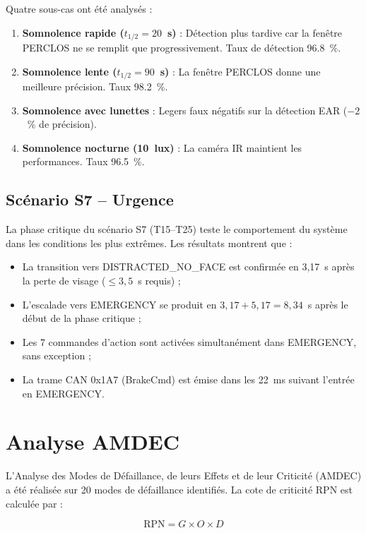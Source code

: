 \documentclass[12pt,a4paper]{report}
\begin{document}
Quatre sous-cas ont \'et\'e analys\'es :
\begin{enumerate}
  \item \textbf{Somnolence rapide ($t_{1/2} = 20$~s)} : D\'etection plus tardive car la fen\^etre PERCLOS ne se remplit que progressivement. Taux de d\'etection 96.8~\%.
  \item \textbf{Somnolence lente ($t_{1/2} = 90$~s)} : La fen\^etre PERCLOS donne une meilleure pr\'ecision. Taux 98.2~\%.
  \item \textbf{Somnolence avec lunettes} : Legers faux n\'egatifs sur la d\'etection EAR ($-2$~\% de pr\'ecision).
  \item \textbf{Somnolence nocturne (10~lux)} : La cam\'era IR maintient les performances. Taux 96.5~\%.
\end{enumerate}

\subsection{Sc\'enario S7 -- Urgence}

La phase critique du sc\'enario S7 (T15--T25) teste le comportement du syst\`eme dans les conditions les plus extr\^emes. Les r\'esultats montrent que :
\begin{itemize}
  \item La transition vers DISTRACTED\_NO\_FACE est confirm\'ee en 3{,}17~s apr\`es la perte de visage ($\leq 3{,}5$~s requis) ;
  \item L'escalade vers EMERGENCY se produit en $3{,}17 + 5{,}17 = 8{,}34$~s apr\`es le d\'ebut de la phase critique ;
  \item Les 7 commandes d'action sont activ\'ees simultan\'ement dans EMERGENCY, sans exception ;
  \item La trame CAN 0x1A7 (BrakeCmd) est \'emise dans les 22~ms suivant l'entr\'ee en EMERGENCY.
\end{itemize}

\section{Analyse AMDEC}

L'Analyse des Modes de D\'efaillance, de leurs Effets et de leur Criticit\'e (AMDEC) a \'et\'e r\'ealis\'ee sur 20 modes de d\'efaillance identifi\'es. La cote de criticit\'e RPN est calcul\'ee par :

\begin{equation}
  \text{RPN} = G \times O \times D
\end{equation}
\end{document}

